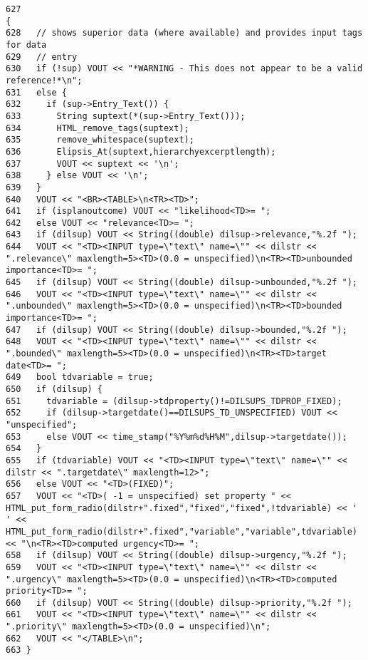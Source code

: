 \footnotesize\begin{verbatim}627                                                                                                                                                      {
628   // shows superior data (where available) and provides input tags for data
629   // entry
630   if (!sup) VOUT << "*WARNING - This does not appear to be a valid reference!*\n";
631   else {
632     if (sup->Entry_Text()) {
633       String suptext(*(sup->Entry_Text()));
634       HTML_remove_tags(suptext);
635       remove_whitespace(suptext);
636       Elipsis_At(suptext,hierarchyexcerptlength);
637       VOUT << suptext << '\n';
638     } else VOUT << '\n';
639   }
640   VOUT << "<BR><TABLE>\n<TR><TD>";
641   if (isplanoutcome) VOUT << "likelihood<TD>= ";
642   else VOUT << "relevance<TD>= ";
643   if (dilsup) VOUT << String((double) dilsup->relevance,"%.2f ");
644   VOUT << "<TD><INPUT type=\"text\" name=\"" << dilstr << ".relevance\" maxlength=5><TD>(0.0 = unspecified)\n<TR><TD>unbounded importance<TD>= ";
645   if (dilsup) VOUT << String((double) dilsup->unbounded,"%.2f ");
646   VOUT << "<TD><INPUT type=\"text\" name=\"" << dilstr << ".unbounded\" maxlength=5><TD>(0.0 = unspecified)\n<TR><TD>bounded importance<TD>= ";
647   if (dilsup) VOUT << String((double) dilsup->bounded,"%.2f ");
648   VOUT << "<TD><INPUT type=\"text\" name=\"" << dilstr << ".bounded\" maxlength=5><TD>(0.0 = unspecified)\n<TR><TD>target date<TD>= ";
649   bool tdvariable = true;
650   if (dilsup) {
651     tdvariable = (dilsup->tdproperty()!=DILSUPS_TDPROP_FIXED);
652     if (dilsup->targetdate()==DILSUPS_TD_UNSPECIFIED) VOUT << "unspecified";
653     else VOUT << time_stamp("%Y%m%d%H%M",dilsup->targetdate());
654   }
655   if (tdvariable) VOUT << "<TD><INPUT type=\"text\" name=\"" << dilstr << ".targetdate\" maxlength=12>";
656   else VOUT << "<TD>(FIXED)";
657   VOUT << "<TD>( -1 = unspecified) set property " << HTML_put_form_radio(dilstr+".fixed","fixed","fixed",!tdvariable) << ' ' << HTML_put_form_radio(dilstr+".fixed","variable","variable",tdvariable) << "\n<TR><TD>computed urgency<TD>= ";
658   if (dilsup) VOUT << String((double) dilsup->urgency,"%.2f ");
659   VOUT << "<TD><INPUT type=\"text\" name=\"" << dilstr << ".urgency\" maxlength=5><TD>(0.0 = unspecified)\n<TR><TD>computed priority<TD>= ";
660   if (dilsup) VOUT << String((double) dilsup->priority,"%.2f ");
661   VOUT << "<TD><INPUT type=\"text\" name=\"" << dilstr << ".priority\" maxlength=5><TD>(0.0 = unspecified)\n";
662   VOUT << "</TABLE>\n";
663 }
\end{verbatim}\normalsize 
{}
